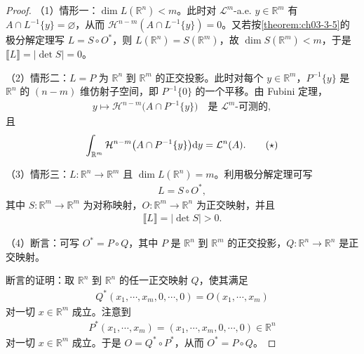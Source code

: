 \documentclass[../../main.tex]{subfiles}%
\begin{document}
\begin{proof}
（1）情形一：$\dim L(\mathbb{R}^n)<m$。此时对 $\mathcal{L}^m$-a.e. $y\in\mathbb{R}^m$ 有 $A\cap L^{-1}\{y\}=\varnothing$，从而 $\mathcal{H}^{n-m}(A\cap L^{-1}\{y\})=0$。又若按\cref{theorem:ch03-3-5}的极分解定理写 $L=S\circ O^*$，则 $L(\mathbb{R}^n)=S(\mathbb{R}^m)$，故 $\dim S(\mathbb{R}^m)<m$，于是 $\llbracket L\rrbracket=|\det S|=0$。%

（2）情形二：$L=P$ 为 $\mathbb{R}^n$ 到 $\mathbb{R}^m$ 的正交投影。此时对每个 $y\in\mathbb{R}^m$，$P^{-1}\{y\}$ 是 $\mathbb{R}^n$ 的 $(n-m)$ 维仿射子空间，即 $P^{-1}\{0\}$ 的一个平移。由 Fubini 定理，
\begin{align*}
y\mapsto\mathcal{H}^{n-m}\bigl(A\cap P^{-1}\{y\}\bigr)\quad\text{是 }\mathcal{L}^m\text{-可测的},
\end{align*}
且
\begin{align*}
\int_{\mathbb{R}^m}\mathcal{H}^{n-m}\bigl(A\cap P^{-1}\{y\}\bigr)\mathrm{d} y=\mathcal{L}^n(A).\qquad(\star)
\end{align*}

（3）情形三：$L:\mathbb{R}^n\to\mathbb{R}^m$ 且 $\dim L(\mathbb{R}^n)=m$。利用极分解定理可写
\begin{align*}
L=S\circ O^*,
\end{align*}
其中 $S:\mathbb{R}^m\to\mathbb{R}^m$ 为对称映射，$O:\mathbb{R}^m\to\mathbb{R}^n$ 为正交映射，并且
\begin{align*}
\llbracket L\rrbracket=|\det S|>0.
\end{align*}

（4）断言：可写 $O^*=P\circ Q$，其中 $P$ 是 $\mathbb{R}^n$ 到 $\mathbb{R}^m$ 的正交投影，$Q:\mathbb{R}^n\to\mathbb{R}^n$ 是正交映射。

断言的证明：取 $\mathbb{R}^n$ 到 $\mathbb{R}^n$ 的任一正交映射 $Q$，使其满足
\begin{align*}
Q^*(x_1,\cdots,x_m,0,\cdots,0)=O(x_1,\cdots,x_m)
\end{align*}
对一切 $x\in\mathbb{R}^m$ 成立。注意到
\begin{align*}
P^*(x_1,\cdots,x_m)=(x_1,\cdots,x_m,0,\cdots,0)\in\mathbb{R}^n
\end{align*}
对一切 $x\in\mathbb{R}^m$ 成立。于是 $O=Q^*\circ P^*$，从而 $O^*=P\circ Q$。


\end{proof}
\end{document}
